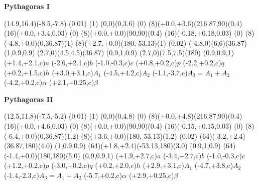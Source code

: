 

\def\Disk(#1,#2){\Circle(16)(#1,#2,0.03) \Gfill(0)}



\begin{center}
{\Huge\bf{Pythagoras I}}
\bigskip

\begin{lapdf}(14.9,16.4)(-8.5,-7.8)
 \Setwidth(0.01)
 \Dash(1)
 \Line(0,0)(0,3.6) \Stroke
 \Dash(0)
 \Arc(8)(+0.0,+3.6)(216.87,90)(0.4)
 \Disk(+0.0,+3.4)
 \Arc(8)(+0.0,+0.0)(90,90)(0.4)
 \Disk(-0.18,+0.18)
 \Varc(8)(-4.8,+0.0)(0,36.87)(1)
 \Varc(8)(+2.7,+0.0)(180,-53.13)(1)
 \Setwidth(0.02)
 \Red
 \Rectangle(-4.8,0)(6,6)(36.87) \Fill(1,0.9,0.9)
 \Green
 \Rectangle(2.7,0)(4.5,4.5)(36.87) \Fill(0.9,1,0.9)
 \Blue
 \Rectangle(2.7,0)(7.5,7.5)(180) \Fill(0.9,0.9,1)
 \Text(+1.4,+2.1,c){$a$}
 \Text(-2.6,+2.1,c){$b$}
 \Text(-1.0,-0.3,c){$c$}
 \Text(+0.8,+0.2,c){$p$}
 \Text(-2.2,+0.2,c){$q$}
 \Text(+0.2,+1.5,c){$h$}
 \Text(+3.0,+3.1,c){$A_1$}
 \Text(-4.5,+4.2,c){$A_2$}
 \Text(-1.1,-3.7,c){$A_3=A_1+A_2$}
 \Text(-4.2,+0.2,c){$\alpha$}
 \Text(+2.1,+0.25,c){$\beta$}
\end{lapdf}

\newpage

{\Huge\bf{Pythagoras II}}
\bigskip

\begin{lapdf}(12.5,11.8)(-7.5,-5.2)
 \Setwidth(0.01)
 \Dash(1)
 \Line(0,0)(0,4.8) \Stroke
 \Dash(0)
 \Arc(8)(+0.0,+4.8)(216.87,90)(0.4)
 \Disk(+0.0,+4.6)
 \Arc(8)(+0.0,+0.0)(90,90)(0.4)
 \Disk(-0.15,+0.15)
 \Varc(8)(-6.4,+0.0)(0,36.87)(1.2)
 \Varc(8)(+3.6,+0.0)(180,-53.13)(1.2)
 \Setwidth(0.02)
 \Red
 \Sector(64)(-3.2,+2.4)(36.87,180)(4.0) \Fill(1,0.9,0.9)
 \Green
 \Sector(64)(+1.8,+2.4)(-53.13,180)(3.0) \Fill(0.9,1,0.9)
 \Blue
 \Sector(64)(-1.4,+0.0)(180,180)(5.0) \Fill(0.9,0.9,1)
 \Text(+1.9,+2.7,c){$a$}
 \Text(-3.4,+2.7,c){$b$}
 \Text(-1.0,-0.3,c){$c$}
 \Text(+1.2,+0.2,c){$p$}
 \Text(-3.0,+0.2,c){$q$}
 \Text(+0.2,+2.0,c){$h$}
 \Text(+2.9,+3.1,c){$A_1$}
 \Text(-4.7,+3.8,c){$A_2$}
 \Text(-1.4,-2.3,c){$A_3=A_1+A_2$}
 \Text(-5.7,+0.2,c){$\alpha$}
 \Text(+2.9,+0.25,c){$\beta$}
\end{lapdf}
\end{center}

